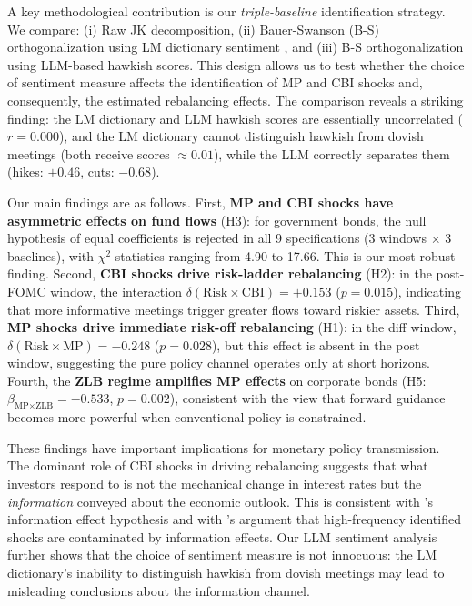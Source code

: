 \documentclass[11pt,a4paper]{article}
\begin{document}
A key methodological contribution is our \textit{triple-baseline} identification strategy. We compare: (i) Raw JK decomposition, (ii) Bauer-Swanson (B-S) orthogonalization using LM dictionary sentiment \citep{loughran2011when}, and (iii) B-S orthogonalization using LLM-based hawkish scores. This design allows us to test whether the choice of sentiment measure affects the identification of MP and CBI shocks and, consequently, the estimated rebalancing effects. The comparison reveals a striking finding: the LM dictionary and LLM hawkish scores are essentially uncorrelated ($r = 0.000$), and the LM dictionary cannot distinguish hawkish from dovish meetings (both receive scores $\approx 0.01$), while the LLM correctly separates them (hikes: $+0.46$, cuts: $-0.68$).

Our main findings are as follows. First, \textbf{MP and CBI shocks have asymmetric effects on fund flows} (H3): for government bonds, the null hypothesis of equal coefficients is rejected in all 9 specifications (3 windows $\times$ 3 baselines), with $\chi^2$ statistics ranging from 4.90 to 17.66. This is our most robust finding. Second, \textbf{CBI shocks drive risk-ladder rebalancing} (H2): in the post-FOMC window, the interaction $\delta(\text{Risk}\times\text{CBI}) = +0.153$ ($p = 0.015$), indicating that more informative meetings trigger greater flows toward riskier assets. Third, \textbf{MP shocks drive immediate risk-off rebalancing} (H1): in the diff window, $\delta(\text{Risk}\times\text{MP}) = -0.248$ ($p = 0.028$), but this effect is absent in the post window, suggesting the pure policy channel operates only at short horizons. Fourth, the \textbf{ZLB regime amplifies MP effects} on corporate bonds (H5: $\beta_{\text{MP}\times\text{ZLB}} = -0.533$, $p = 0.002$), consistent with the view that forward guidance becomes more powerful when conventional policy is constrained.

These findings have important implications for monetary policy transmission. The dominant role of CBI shocks in driving rebalancing suggests that what investors respond to is not the mechanical change in interest rates but the \textit{information} conveyed about the economic outlook. This is consistent with \citet{nakamura2018high}'s information effect hypothesis and with \citet{bauer2023reassessment}'s argument that high-frequency identified shocks are contaminated by information effects. Our LLM sentiment analysis further shows that the choice of sentiment measure is not innocuous: the LM dictionary's inability to distinguish hawkish from dovish meetings may lead to misleading conclusions about the information channel.
\end{document}
